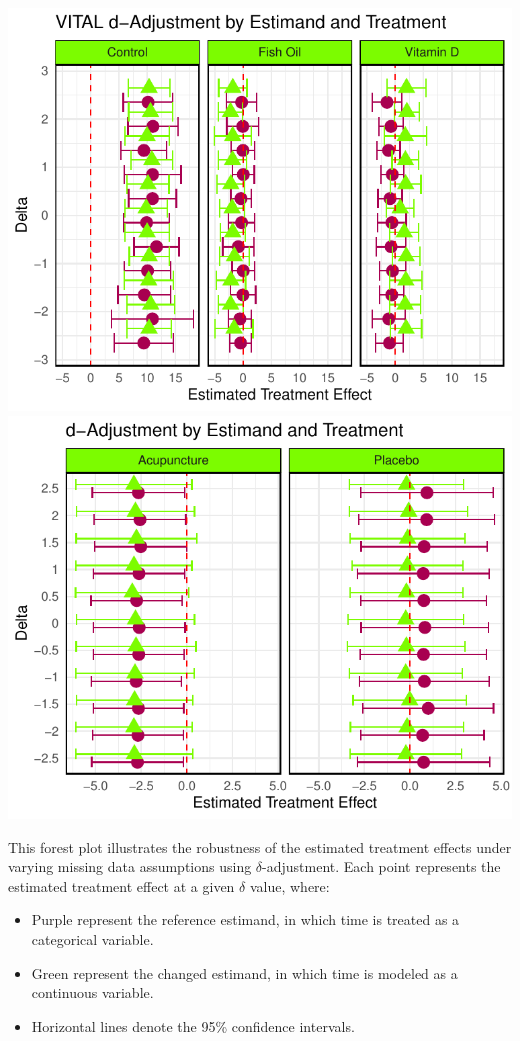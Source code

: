 \documentclass{article}
\providecommand{\tightlist}{%
  \setlength{\itemsep}{0pt}\setlength{\parskip}{0pt}}
\newcommand{\pandocbounded}[1]{#1}
\begin{document}
\pandocbounded{\includegraphics[keepaspectratio]{Final_Report_files/figure-latex/unnamed-chunk-40-1.pdf}}
\pandocbounded{\includegraphics[keepaspectratio]{Final_Report_files/figure-latex/unnamed-chunk-40-2.pdf}}

This forest plot illustrates the robustness of the estimated treatment
effects under varying missing data assumptions using
\(\delta\)-adjustment. Each point represents the estimated treatment
effect at a given \(\delta\) value, where:

\begin{itemize}
\tightlist
\item
  Purple represent the reference estimand, in which time is treated as a
  categorical variable.
\item
  Green represent the changed estimand, in which time is modeled as a
  continuous variable.
\item
  Horizontal lines denote the 95\% confidence intervals.
\end{itemize}
\end{document}
